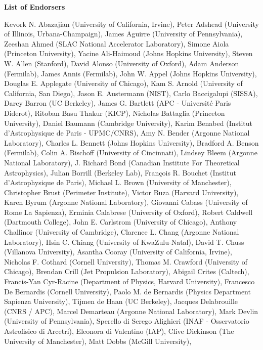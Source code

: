 \begin{center}
\textbf{List of Endorsers}
\end{center}
Kevork N. Abazajian (University of California, Irvine),
Peter Adshead (University of Illinois, Urbana-Champaign),
James Aguirre (University of Pennsylvania),
Zeeshan Ahmed (SLAC National Accelerator Laboratory),
Simone Aiola (Princeton University),
Yacine Ali-Haimoud (Johns Hopkins University),
Steven W. Allen (Stanford),
David Alonso (University of Oxford),
Adam Anderson (Fermilab),
James Annis (Fermilab),
John W. Appel (Johns Hopkins University),
Douglas E. Applegate (University of Chicago),
Kam S. Arnold (University of California, San Diego),
Jason E. Austermann (NIST),
Carlo Baccigalupi (SISSA),
Darcy Barron (UC Berkeley),
James G. Bartlett (APC - Université Paris Diderot),
Ritoban Basu Thakur (KICP),
Nicholas Battaglia (Princeton University),
Daniel Baumann (Cambridge University),
Karim Benabed (Institut d'Astrophysique de Paris - UPMC/CNRS),
Amy N. Bender (Argonne National Laboratory),
Charles L. Bennett (Johns Hopkins University),
Bradford A. Benson (Fermilab),
Colin A. Bischoff (University of Cincinnati),
Lindsey Bleem (Argonne National Laboratory),
J. Richard Bond (Canadian Institute For Theoretical Astrophysics),
Julian Borrill (Berkeley Lab),
François R. Bouchet (Institut d'Astrophysique de Paris),
Michael L. Brown (University of Manchester),
Christopher Brust (Perimeter Institute),
Victor Buza (Harvard University),
Karen Byrum (Argonne National Laboratory),
Giovanni Cabass (University of Rome La Sapienza),
Erminia Calabrese (University of Oxford),
Robert Caldwell (Dartmouth College),
John E. Carlstrom (University of Chicago),
Anthony Challinor (University of Cambridge),
Clarence L. Chang (Argonne National Laboratory),
Hsin C. Chiang (University of KwaZulu-Natal),
David T. Chuss (Villanova University),
Asantha Cooray (University of California, Irvine),
Nicholas F. Cothard (Cornell University),
Thomas M. Crawford (University of Chicago),
Brendan Crill (Jet Propulsion Laboratory),
Abigail Crites (Caltech),
Francis-Yan Cyr-Racine (Department of Physics, Harvard University),
Francesco De Bernardis (Cornell University),
Paolo M. de Bernardis (Physics Department Sapienza University),
Tijmen de Haan (UC Berkeley),
Jacques Delabrouille (CNRS / APC),
Marcel Demarteau (Argonne National Laboratory),
Mark Devlin (University of Pennsylvania),
Sperello di Serego Alighieri (INAF - Osservatorio Astrofisico di Arcetri),
Eleonora di Valentino (IAP),
Clive Dickinson (The University of Manchester),
Matt Dobbs (McGill University),
